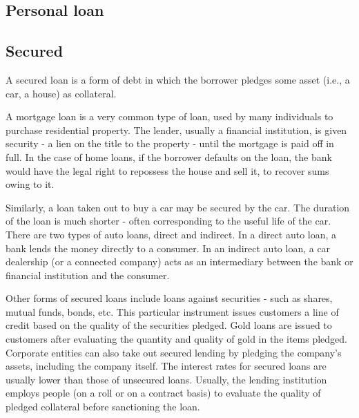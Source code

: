 \subsection{Personal loan}
\label{sss:pers-886e}





\subsection{Secured}
\label{sss:secu-a7c5}




A secured loan is a form of debt in which the borrower pledges some asset (i.e., a car, a
house) as collateral.



A mortgage loan is a very common type of loan, used by many individuals to purchase
residential property. The lender, usually a financial institution, is given security - a
lien on the title to the property - until the mortgage is paid off in full. In the case of
home loans, if the borrower defaults on the loan, the bank would have the legal right to
repossess the house and sell it, to recover sums owing to it.



Similarly, a loan taken out to buy a car may be secured by the car. The duration of the
loan is much shorter - often corresponding to the useful life of the car. There are two
types of auto loans, direct and indirect. In a direct auto loan, a bank lends the money
directly to a consumer. In an indirect auto loan, a car dealership (or a connected
company) acts as an intermediary between the bank or financial institution and the
consumer.



Other forms of secured loans include loans against securities - such as shares, mutual
funds, bonds, etc. This particular instrument issues customers a line of credit based on
the quality of the securities pledged. Gold loans are issued to customers after evaluating
the quantity and quality of gold in the items pledged. Corporate entities can also take
out secured lending by pledging the company's assets, including the company itself. The
interest rates for secured loans are usually lower than those of unsecured loans. Usually,
the lending institution employs people (on a roll or on a contract basis) to evaluate the
quality of pledged collateral before sanctioning the loan.




